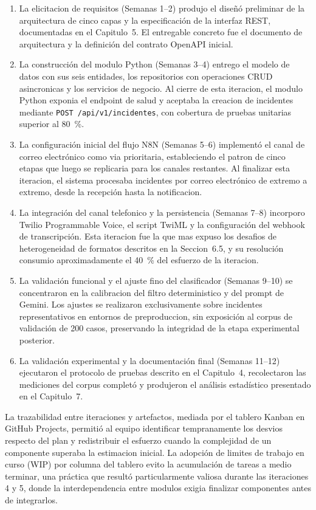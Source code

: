 \begin{enumerate}[label=Iteracion \arabic*:, leftmargin=*]
  \item La elicitacion de requisitos (Semanas 1--2) produjo el diseñó preliminar de la arquitectura de cinco capas y la especificación de la interfaz REST, documentadas en el Capitulo~5. El entregable concreto fue el documento de arquitectura y la definición del contrato OpenAPI inicial.
  \item La construcción del modulo Python (Semanas 3--4) entrego el modelo de datos con sus seis entidades, los repositorios con operaciones CRUD asincronicas y los servicios de negocio. Al cierre de esta iteracion, el modulo Python exponia el endpoint de salud y aceptaba la creacion de incidentes mediante \texttt{POST /api/v1/incidentes}, con cobertura de pruebas unitarias superior al 80~\%.
  \item La configuración inicial del flujo N8N (Semanas 5--6) implementó el canal de correo electrónico como via prioritaria, estableciendo el patron de cinco etapas que luego se replicaria para los canales restantes. Al finalizar esta iteracion, el sistema procesaba incidentes por correo electrónico de extremo a extremo, desde la recepción hasta la notificacion.
  \item La integración del canal telefonico y la persistencia (Semanas 7--8) incorporo Twilio Programmable Voice, el script TwiML y la configuración del webhook de transcripción. Esta iteracion fue la que mas expuso los desafios de heterogeneidad de formatos descritos en la Seccion~6.5, y su resolución consumio aproximadamente el 40~\% del esfuerzo de la iteracion.
  \item La validación funcional y el ajuste fino del clasificador (Semanas 9--10) se concentraron en la calibracion del filtro deterministico y del prompt de Gemini. Los ajustes se realizaron exclusivamente sobre incidentes representativos en entornos de preproduccion, sin exposición al corpus de validación de 200 casos, preservando la integridad de la etapa experimental posterior.
  \item La validación experimental y la documentación final (Semanas 11--12) ejecutaron el protocolo de pruebas descrito en el Capitulo~4, recolectaron las mediciones del corpus completó y produjeron el análisis estadístico presentado en el Capitulo~7.
\end{enumerate}

La trazabilidad entre iteraciones y artefactos, mediada por el tablero Kanban en GitHub Projects, permitió al equipo identificar tempranamente los desvios respecto del plan y redistribuir el esfuerzo cuando la complejidad de un componente superaba la estimacion inicial. La adopción de limites de trabajo en curso (WIP) por columna del tablero evito la acumulación de tareas a medio terminar, una práctica que resultó particularmente valiosa durante las iteraciones 4 y 5, donde la interdependencia entre modulos exigia finalizar componentes antes de integrarlos.

